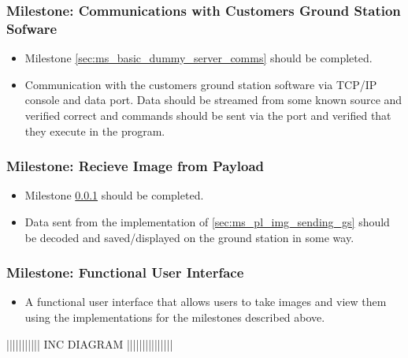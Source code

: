 	\subsubsection{Milestone: Communications with Customers Ground Station Sofware}
		\label{sec:ms_gs_basestation_comms}
		\begin{itemize}
			\item 	Milestone \ref{sec:ms_basic_dummy_server_comms} should be
				completed.
			\item 	Communication with the customers ground station software via TCP/IP console and
				data port. Data should be streamed from some known source and verified correct and
				commands should be sent via the port and verified that they execute in the program.
		\end{itemize}

	\subsubsection{Milestone: Recieve Image from Payload}
		\label{sec:ms_gs_recieve_image}
		\begin{itemize}
			\item 	Milestone \ref{sec:ms_gs_basestation_comms} should be completed.
			\item 	Data sent from the implementation of \ref{sec:ms_pl_img_sending_gs} should be
				decoded and saved/displayed on the ground station in some way.
		\end{itemize}


	\subsubsection{Milestone: Functional User Interface}
		\begin{itemize}
			\item 	A functional user interface that allows users to take images and view them using the implementations
				for the milestones described above.
		\end{itemize}



||||||||||| INC DIAGRAM |||||||||||||||